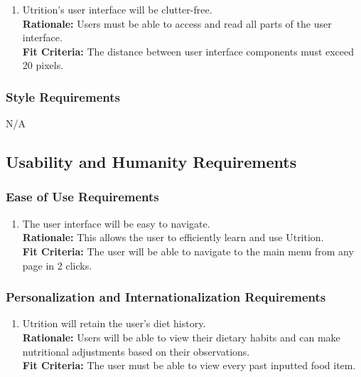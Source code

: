 \documentclass[12pt]{article}
\begin{document}
\begin{enumerate}[{LF}1. ]
	\item Utrition’s user interface will be clutter-free.\\
	\textbf{Rationale:} Users must be able to access and read all parts of the user interface. \\
	\textbf{Fit Criteria:} The distance between user interface components must exceed 20 pixels.
\end{enumerate}

\subsubsection{Style Requirements}
\hspace{1.5cm}N/A

\subsection{Usability and Humanity Requirements}

\subsubsection{Ease of Use Requirements}

\begin{enumerate}[{UH}1. ]
	\item The user interface will be easy to navigate. \\
	\textbf{Rationale:} This allows the user to efficiently learn and use Utrition.\\
	\textbf{Fit Criteria:} The user will be able to navigate to the main menu from any page in 2 clicks.
\end{enumerate}

\subsubsection{Personalization and Internationalization Requirements}

\begin{enumerate}[{UH}2. ] 
	\item Utrition will retain the user’s diet history.\\
	\textbf{Rationale:} Users will be able to view their dietary habits and can make nutritional adjustments based on their observations.\\
	\textbf{Fit Criteria:} The user must be able to view every past inputted food item.
	
\end{enumerate}
\end{document}
